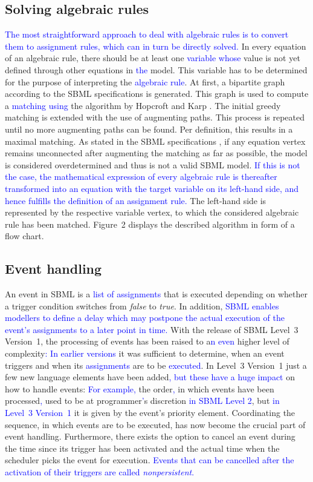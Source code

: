 \documentclass[10pt]{bmc_article}
\newenvironment{bmcformat}{\fussy\setboolean{publ}{true}}{\fussy}
\newcommand{\COR}[1]                      {\textcolor{blue}{#1}}
\newcommand{\true}                        {\emph{true}\xspace}
\newcommand{\false}                       {\emph{false}\xspace}
\begin{document}
\begin{bmcformat}
\subsection*{Solving algebraic rules}
\COR{The most straightforward approach to deal with algebraic rules is to convert them to assignment rules, which can in turn be directly solved.}
In every equation of an algebraic rule, there should be at least one \COR{variable 
whose} value is not yet defined through other equations in \COR{the} model. This variable has to be determined 
for the purpose of interpreting the \COR{algebraic rule}. 
At first, a bipartite graph according to the \acs{SBML} specifications is generated. This graph is used to 
compute a \COR{matching using} the algorithm by Hopcroft and Karp
\cite{hopcroft1973n}. The initial greedy matching is extended with the use of augmenting paths. This process is
repeated until no more augmenting paths can be found. Per definition, this results in a maximal matching. 
As stated in the \acs{SBML} specifications \cite{Finney2006, Hucka2007, Hucka2008, Hucka2010a}, if any equation vertex remains unconnected after augmenting the matching as far as possible, the model is considered overdetermined and thus is not a valid \acs{SBML} model.
\COR{If this is not the case, the mathematical expression of every algebraic rule is thereafter 
transformed into an equation with the target variable on its left-hand side, and hence fulfills the definition of an assignment rule.}
The left-hand side is represented by the respective variable vertex, to which the considered algebraic rule has been matched.
Figure~2 displays the described algorithm in form of a flow chart.


\subsection*{Event handling}
An event in \acs{SBML} is a \COR{list of assignments} that is executed depending on whether a trigger 
condition switches from \false to \true.
In addition, \COR{\acs{SBML} enables modellers to define a delay which may postpone the actual execution of the event's assignments
to a later point in time.}
With the release of \acs{SBML} Level~3 Version~1, the processing of events has been
raised to a\COR{n even} higher level of complexity\COR{:}
\COR{In earlier versions} it was sufficient to determine, when an event triggers and when its \COR{assignments} are to be \COR{executed}.
In Level~3 Version~1 just a few new language elements have been added\COR{, but these have a huge impact} on how to handle events:
\COR{For example,} the order\COR{,} in which events have been processed\COR{,} used to be at programmer\COR{'}s discretion \COR{in \acs{SBML} Level 2},
but \COR{in Level~3 Version~1} it is given by the event's priority element.
Coordinating the sequence, in which events are to be executed, has now become the crucial part of event handling. 
Furthermore, there exists the option to cancel an event during the time since its trigger 
has been activated and the actual time when the scheduler picks the event for execution.
\COR{Events that can be cancelled after the activation of their triggers are called \emph{nonpersistent}.}


\end{bmcformat}
\end{document}
